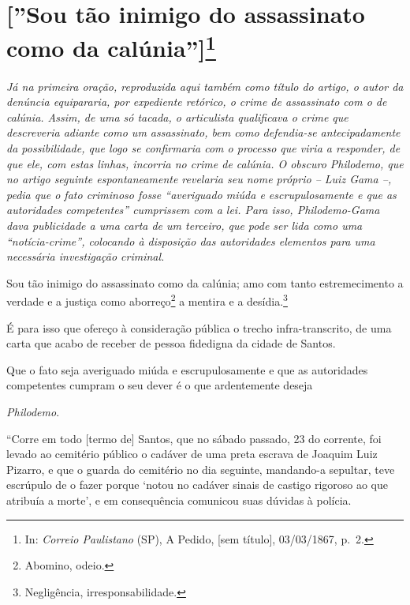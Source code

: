 \chapter{{[}''Sou tão inimigo do assassinato como da
calúnia''{]}\footnote{In: \emph{Correio Paulistano} (SP), A Pedido,
  {[}sem título{]}, 03/03/1867, p.~2.}}

\begin{didascalia}
\emph{Já na primeira oração, reproduzida aqui também como título do
artigo, o autor da denúncia equipararia, por expediente retórico, o
crime de assassinato com o de calúnia. Assim, de uma só tacada, o
articulista qualificava o crime que descreveria adiante como um
assassinato, bem como defendia-se antecipadamente da possibilidade, que
logo se confirmaria com o processo que viria a responder, de que ele,
com estas linhas, incorria no crime de calúnia. O obscuro Philodemo, que
no artigo seguinte espontaneamente revelaria seu nome próprio -- Luiz
Gama --, pedia que o fato criminoso fosse ``averiguado miúda e
escrupulosamente e que as autoridades competentes'' cumprissem com a lei.
Para isso, Philodemo-Gama dava publicidade a uma carta de um terceiro,
que pode ser lida como uma ``notícia-crime'', colocando à disposição das
autoridades elementos para uma necessária investigação criminal.}
\end{didascalia}

\asterisc{}

Sou tão inimigo do assassinato como da calúnia; amo com tanto
estremecimento a verdade e a justiça como aborreço\footnote{ Abomino,
  odeio.} a mentira e a desídia.\footnote{ Negligência,
  irresponsabilidade.}

É para isso que ofereço à consideração pública o trecho
infra-transcrito, de uma carta que acabo de receber de pessoa fidedigna
da cidade de Santos.

Que o fato seja averiguado miúda e escrupulosamente e que as autoridades
competentes cumpram o seu dever é o que ardentemente deseja

\emph{Philodemo}.

\asterisc{}

``Corre em todo {[}termo de{]} Santos, que no sábado passado, 23 do
corrente, foi levado ao cemitério público o cadáver de uma preta escrava
de Joaquim Luiz Pizarro, e que o guarda do cemitério no dia seguinte,
mandando-a sepultar, teve escrúpulo de o fazer porque `notou no cadáver
sinais de castigo rigoroso ao que atribuía a morte', e em consequência
comunicou suas dúvidas à polícia.

